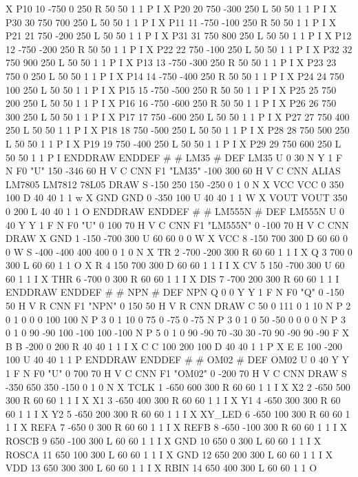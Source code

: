 X P10 10 -750 0 250 R 50 50 1 1 P I
X P20 20 750 -300 250 L 50 50 1 1 P I
X P30 30 750 700 250 L 50 50 1 1 P I
X P11 11 -750 -100 250 R 50 50 1 1 P I
X P21 21 750 -200 250 L 50 50 1 1 P I
X P31 31 750 800 250 L 50 50 1 1 P I
X P12 12 -750 -200 250 R 50 50 1 1 P I
X P22 22 750 -100 250 L 50 50 1 1 P I
X P32 32 750 900 250 L 50 50 1 1 P I
X P13 13 -750 -300 250 R 50 50 1 1 P I
X P23 23 750 0 250 L 50 50 1 1 P I
X P14 14 -750 -400 250 R 50 50 1 1 P I
X P24 24 750 100 250 L 50 50 1 1 P I
X P15 15 -750 -500 250 R 50 50 1 1 P I
X P25 25 750 200 250 L 50 50 1 1 P I
X P16 16 -750 -600 250 R 50 50 1 1 P I
X P26 26 750 300 250 L 50 50 1 1 P I
X P17 17 750 -600 250 L 50 50 1 1 P I
X P27 27 750 400 250 L 50 50 1 1 P I
X P18 18 750 -500 250 L 50 50 1 1 P I
X P28 28 750 500 250 L 50 50 1 1 P I
X P19 19 750 -400 250 L 50 50 1 1 P I
X P29 29 750 600 250 L 50 50 1 1 P I
ENDDRAW
ENDDEF
#
# LM35
#
DEF LM35 U 0 30 N Y 1 F N
F0 "U" 150 -346 60 H V C CNN
F1 "LM35" -100 300 60 H V C CNN
ALIAS LM7805 LM7812 78L05
DRAW
S -150 250 150 -250 0 1 0 N
X VCC VCC 0 350 100 D 40 40 1 1 w
X GND GND 0 -350 100 U 40 40 1 1 W
X VOUT VOUT 350 0 200 L 40 40 1 1 O
ENDDRAW
ENDDEF
#
# LM555N
#
DEF LM555N U 0 40 Y Y 1 F N
F0 "U" 0 100 70 H V C CNN
F1 "LM555N" 0 -100 70 H V C CNN
DRAW
X GND 1 -150 -700 300 U 60 60 0 0 W
X VCC 8 -150 700 300 D 60 60 0 0 W
S -400 -400 400 400 0 1 0 N
X TR 2 -700 -200 300 R 60 60 1 1 I
X Q 3 700 0 300 L 60 60 1 1 O
X R 4 150 700 300 D 60 60 1 1 I I
X CV 5 150 -700 300 U 60 60 1 1 I
X THR 6 -700 0 300 R 60 60 1 1 I
X DIS 7 -700 200 300 R 60 60 1 1 I
ENDDRAW
ENDDEF
#
# NPN
#
DEF NPN Q 0 0 Y Y 1 F N
F0 "Q" 0 -150 50 H V R CNN
F1 "NPN" 0 150 50 H V R CNN
DRAW
C 50 0 111 0 1 10 N
P 2 0 1 0  0 0  100 100 N
P 3 0 1 10  0 75  0 -75  0 -75 N
P 3 0 1 0  50 -50  0 0  0 0 N
P 3 0 1 0  90 -90  100 -100  100 -100 N
P 5 0 1 0  90 -90  70 -30  30 -70  90 -90  90 -90 F
X B B -200 0 200 R 40 40 1 1 I
X C C 100 200 100 D 40 40 1 1 P
X E E 100 -200 100 U 40 40 1 1 P
ENDDRAW
ENDDEF
#
# OM02
#
DEF OM02 U 0 40 Y Y 1 F N
F0 "U" 0 700 70 H V C CNN
F1 "OM02" 0 -200 70 H V C CNN
DRAW
S -350 650 350 -150 0 1 0 N
X TCLK 1 -650 600 300 R 60 60 1 1 I
X X2 2 -650 500 300 R 60 60 1 1 I
X X1 3 -650 400 300 R 60 60 1 1 I
X Y1 4 -650 300 300 R 60 60 1 1 I
X Y2 5 -650 200 300 R 60 60 1 1 I
X XY_LED 6 -650 100 300 R 60 60 1 1 I
X REFA 7 -650 0 300 R 60 60 1 1 I
X REFB 8 -650 -100 300 R 60 60 1 1 I
X ROSCB 9 650 -100 300 L 60 60 1 1 I
X GND 10 650 0 300 L 60 60 1 1 I
X ROSCA 11 650 100 300 L 60 60 1 1 I
X GND 12 650 200 300 L 60 60 1 1 I
X VDD 13 650 300 300 L 60 60 1 1 I
X RBIN 14 650 400 300 L 60 60 1 1 O
